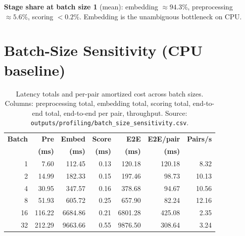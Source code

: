 \documentclass[11pt]{article}
\begin{document}
\textbf{Stage share at batch size 1} (mean): embedding $\approx 94.3\%$, preprocessing
$\approx 5.6\%$, scoring $< 0.2\%$. Embedding is the unambiguous bottleneck on CPU.

\section{Batch-Size Sensitivity (CPU baseline)}
\begin{table}[h]
\centering
\footnotesize
\setlength{\tabcolsep}{4pt}
\begin{tabular}{rrrrrrr}
\toprule
\textbf{Batch} & \textbf{Pre} & \textbf{Embed} & \textbf{Score} & \textbf{E2E} & \textbf{E2E/pair} & \textbf{Pairs/s} \\
                & \textbf{(ms)} & \textbf{(ms)} & \textbf{(ms)} & \textbf{(ms)} & \textbf{(ms)} & \\
\midrule
1  & 7.60   & 112.45  & 0.13 & 120.18  & 120.18 & 8.32 \\
2  & 14.99  & 182.33  & 0.15 & 197.46  & 98.73  & 10.13 \\
4  & 30.95  & 347.57  & 0.16 & 378.68  & 94.67  & 10.56 \\
8  & 51.93  & 605.72  & 0.25 & 657.90  & 82.24  & 12.16 \\
16 & 116.22 & 6684.86 & 0.21 & 6801.28 & 425.08 & 2.35 \\
32 & 212.29 & 9663.66 & 0.55 & 9876.50 & 308.64 & 3.24 \\
\bottomrule
\end{tabular}
\caption{Latency totals and per-pair amortized cost across batch sizes.
Columns: preprocessing total, embedding total, scoring total, end-to-end total,
end-to-end per pair, throughput. Source: \texttt{outputs/profiling/batch\_size\_sensitivity.csv}.}
\end{table}
\end{document}
